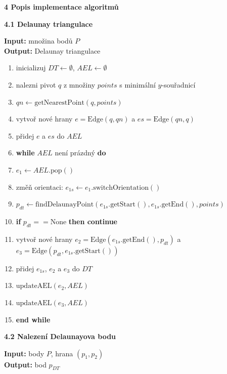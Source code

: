 \documentclass[12pt]{article}
\begin{document}
{\large \textbf{4 Popis implementace algoritmů}}

\textbf{4.1 Delaunay triangulace}

\textbf{Input:} množina bodů $P$ \\
\textbf{Output:} Delaunay triangulace

\begin{enumerate}
    \item inicializuj $DT \leftarrow \emptyset$, $AEL \leftarrow \emptyset$
    \item nalezni pivot $q$ z množiny $points$ s minimální $y$-souřadnicí
    \item $qn \leftarrow \text{getNearestPoint}(q, points)$
    \item vytvoř nové hrany $e = \text{Edge}(q, qn)$ a $es = \text{Edge}(qn, q)$
    \item přidej $e$ a $es$ do $AEL$
    \item \textbf{while} $AEL$ není prázdný \textbf{do}
    \item \quad $e_1 \leftarrow AEL.\text{pop}()$
    \item \quad změň orientaci: $e_{1s} \leftarrow e_1.\text{switchOrientation}()$
    \item \quad $p_{dt} \leftarrow \text{findDelaunayPoint}(e_{1s}.\text{getStart}(), e_{1s}.\text{getEnd}(), points)$
    \item \quad \textbf{if} $p_{dt} == \text{None}$ \textbf{then continue}
    \item \quad vytvoř nové hrany $e_2 = \text{Edge}(e_{1s}.\text{getEnd}(), p_{dt})$ a $e_3 = \text{Edge}(p_{dt}, e_{1s}.\text{getStart}())$
    \item \quad přidej $e_{1s}$, $e_2$ a $e_3$ do $DT$
    \item \quad $\text{updateAEL}(e_2, AEL)$
    \item \quad $\text{updateAEL}(e_3, AEL)$
    \item \textbf{end while}
\end{enumerate}
    
\textbf{4.2 Nalezení Delaunayova bodu}

\textbf{Input:} body $P$, hrana $(p_1, p_2)$ \\
\textbf{Output:} bod $p_{DT}$
\end{document}
